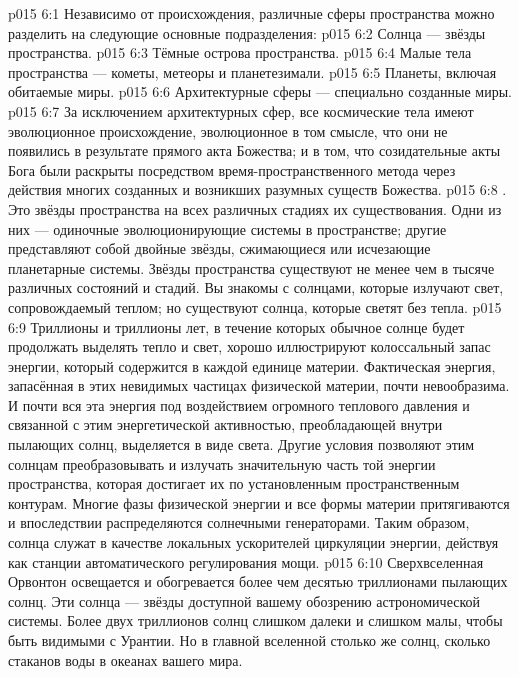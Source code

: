 \vs p015 6:1 Независимо от происхождения, различные сферы пространства можно разделить на следующие основные подразделения:
\vs p015 6:2 Солнца --- звёзды пространства.
\vs p015 6:3 Тёмные острова пространства.
\vs p015 6:4 Малые тела пространства --- кометы, метеоры и планетезимали.
\vs p015 6:5 Планеты, включая обитаемые миры.
\vs p015 6:6 Архитектурные сферы --- специально созданные миры.
\vs p015 6:7 \pc За исключением архитектурных сфер, все космические тела имеют эволюционное происхождение, эволюционное в том смысле, что они не появились в результате прямого акта Божества; и в том, что созидательные акты Бога были раскрыты посредством время\hyp{}пространственного метода через действия многих созданных и возникших разумных существ Божества.
\vs p015 6:8 \pc {}. Это звёзды пространства на всех различных стадиях их существования. Одни из них --- одиночные эволюционирующие системы в пространстве; другие представляют собой двойные звёзды, сжимающиеся или исчезающие планетарные системы. Звёзды пространства существуют не менее чем в тысяче различных состояний и стадий. Вы знакомы с солнцами, которые излучают свет, сопровождаемый теплом; но существуют солнца, которые светят без тепла.
\vs p015 6:9 Триллионы и триллионы лет, в течение которых обычное солнце будет продолжать выделять тепло и свет, хорошо иллюстрируют колоссальный запас энергии, который содержится в каждой единице материи. Фактическая энергия, запасённая в этих невидимых частицах физической материи, почти невообразима. И почти вся эта энергия под воздействием огромного теплового давления и связанной с этим энергетической активностью, преобладающей внутри пылающих солнц, выделяется в виде света. Другие условия позволяют этим солнцам преобразовывать и излучать значительную часть той энергии пространства, которая достигает их по установленным пространственным контурам. Многие фазы физической энергии и все формы материи притягиваются и впоследствии распределяются солнечными генераторами. Таким образом, солнца служат в качестве локальных ускорителей циркуляции энергии, действуя как станции автоматического регулирования мощи.
\vs p015 6:10 Сверхвселенная Орвонтон освещается и обогревается более чем десятью триллионами пылающих солнц. Эти солнца --- звёзды доступной вашему обозрению астрономической системы. Более двух триллионов солнц слишком далеки и слишком малы, чтобы быть видимыми с Урантии. Но в главной вселенной столько же солнц, сколько стаканов воды в океанах вашего мира.
